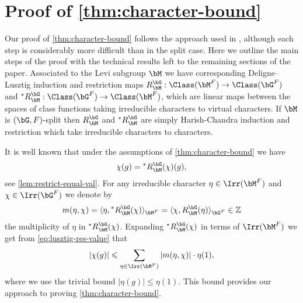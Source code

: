 \documentclass[eqthmnum,nocolour,skinny]{jt-calcs}
\begin{document}
\section{Proof of \cref{thm:character-bound}}\label{1.10}
\begin{pa}
Our proof of \cref{thm:character-bound} follows the approach used in \cite{bezrukavnikov-liebeck-shalev-tiep:2017:character-bounds-grps-Lie-type}, although each step is considerably more difficult than in the split case. Here we outline the main steps of the proof with the technical results left to the remaining sections of the paper. Associated to the Levi subgroup $\bM$ we have corresponding Deligne--Lusztig induction and restriction maps $R_{\bM}^{\bG} : \Class(\bM^F) \to \Class(\bG^F)$ and ${}^*R_{\bM}^{\bG} : \Class(\bG^F) \to \Class(\bM^F)$, which are linear maps between the spaces of class functions taking irreducible characters to virtual characters. If $\bM$ is $(\bG,F)$-split then $R_{\bM}^{\bG}$ and ${}^*R_{\bM}^{\bG}$ are simply Harish-Chandra induction and restriction which take irreducible characters to characters.
\end{pa}

\begin{pa}
It is well known that under the assumptions of \cref{thm:character-bound} we have
\begin{equation}\label{eq:lusztig-res-value}
\chi(g) = {}^*R_{\bM}^{\bG}(\chi)(g),
\end{equation}
see \cref{lem:restrict-equal-val}. For any irreducible character $\eta \in \Irr(\bM^F)$ and $\chi \in \Irr(\bG^F)$ we denote by
\begin{equation*}
m(\eta,\chi) = \langle \eta, {}^*R_{\bM}^{\bG}(\chi)\rangle_{\bM^F} = \langle \chi, R_{\bM}^{\bG}(\eta)\rangle_{\bG^F} \in \mathbb{Z}
\end{equation*}
the multiplicity of $\eta$ in ${}^*R_{\bM}^{\bG}(\chi)$. Expanding ${}^*R_{\bM}^{\bG}(\chi)$ in terms of $\Irr(\bM^F)$ we get from \cref{eq:lusztig-res-value} that
\begin{equation}\label{eq:Lusztig-res-bound}
|\chi(g)| \leqslant \sum_{\eta \in \Irr(\bM^F)} |m(\eta,\chi)|\cdot\eta(1),
\end{equation}
where we use the trivial bound $|\eta(g)| \leqslant \eta(1)$. This bound provides our approach to proving \cref{thm:character-bound}.
\end{pa}
\end{document}
